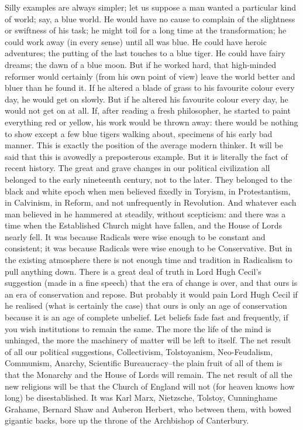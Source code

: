 \documentclass{book}
\begin{document}
Silly examples are always simpler; let us suppose a man wanted a particular kind of world; say, a blue world. He would have no cause to complain of the slightness or swiftness of his task; he might toil for a long time at the transformation; he could work away (in every sense) until all was blue. He could have heroic adventures; the putting of the last touches to a blue tiger. He could have fairy dreams; the dawn of a blue moon. But if he worked hard, that high-minded reformer would certainly (from his own point of view) leave the world better and bluer than he found it. If he altered a blade of grass to his favourite colour every day, he would get on slowly. But if he altered his favourite colour every day, he would not get on at all. If, after reading a fresh philosopher, he started to paint everything red or yellow, his work would be thrown away: there would be nothing to show except a few blue tigers walking about, specimens of his early bad manner. This is exactly the position of the average modern thinker. It will be said that this is avowedly a preposterous example. But it is literally the fact of recent history. The great and grave changes in our political civilization all belonged to the early nineteenth century, not to the later. They belonged to the black and white epoch when men believed fixedly in Toryism, in Protestantism, in Calvinism, in Reform, and not unfrequently in Revolution. And whatever each man believed in he hammered at steadily, without scepticism: and there was a time when the Established Church might have fallen, and the House of Lords nearly fell. It was because Radicals were wise enough to be constant and consistent; it was because Radicals were wise enough to be Conservative. But in the existing atmosphere there is not enough time and tradition in Radicalism to pull anything down. There is a great deal of truth in Lord Hugh Cecil’s suggestion (made in a fine speech) that the era of change is over, and that ours is an era of conservation and repose. But probably it would pain Lord Hugh Cecil if he realised (what is certainly the case) that ours is only an age of conservation because it is an age of complete unbelief. Let beliefs fade fast and frequently, if you wish institutions to remain the same. The more the life of the mind is unhinged, the more the machinery of matter will be left to itself. The net result of all our political suggestions, Collectivism, Tolstoyanism, Neo-Feudalism, Communism, Anarchy, Scientific Bureaucracy–the plain fruit of all of them is that the Monarchy and the House of Lords will remain. The net result of all the new religions will be that the Church of England will not (for heaven knows how long) be disestablished. It was Karl Marx, Nietzsche, Tolstoy, Cunninghame Grahame, Bernard Shaw and Auberon Herbert, who between them, with bowed gigantic backs, bore up the throne of the Archbishop of Canterbury.
\end{document}
